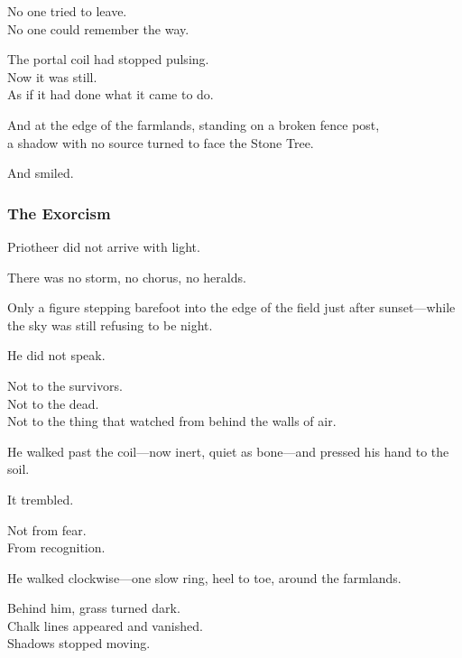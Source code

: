 \documentclass[12pt]{article}
\begin{document}
\vspace{0.5em}
No one tried to leave.\\
No one could remember the way.

\vspace{0.5em}
The portal coil had stopped pulsing.\\
Now it was still.\\
As if it had done what it came to do.

\vspace{0.5em}
And at the edge of the farmlands, standing on a broken fence post,\\
a shadow with no source turned to face the Stone Tree.

\vspace{0.5em}
And smiled.

\dotfill

\subsubsection*{The Exorcism}

Priotheer did not arrive with light.

\vspace{0.5em}
There was no storm, no chorus, no heralds.

\vspace{0.5em}
Only a figure stepping barefoot into the edge of the field just after sunset---while the sky was still refusing to be night.

\vspace{0.5em}
He did not speak.

\vspace{0.5em}
Not to the survivors.\\
Not to the dead.\\
Not to the thing that watched from behind the walls of air.

\vspace{0.5em}
He walked past the coil---now inert, quiet as bone---and pressed his hand to the soil.

\vspace{0.5em}
It trembled.

\vspace{0.5em}
Not from fear.\\
From recognition.

\vspace{0.5em}
He walked clockwise---one slow ring, heel to toe, around the farmlands.

\vspace{0.5em}
Behind him, grass turned dark.\\
Chalk lines appeared and vanished.\\
Shadows stopped moving.
\end{document}
